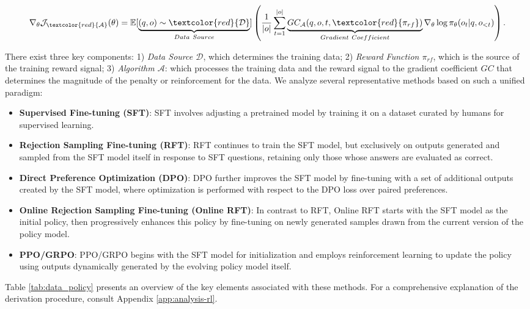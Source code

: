 \begin{itemize}[topsep=0pt]
\begin{itemize}[topsep=0pt]
\begin{equation}
    \nabla_{\theta}\mathcal{J}_{\textcolor{red}{\mathcal{A}}}(\theta) = \mathbb{E}[\underbrace{(q,o) \sim \textcolor{red}{\mathcal{D}}}_{Data \ Source}]\left( \frac{1}{|o|} \sum_{t=1}^{|o|}  \underbrace{GC_{{\mathcal{A}}}(q, o, t, \textcolor{red}{\pi_{{rf}}})}_{Gradient \ Coefficient}  \nabla_{\theta}\log \pi_{\theta}(o_t | q, o_{<t})\right).
\label{eq:objective}
\end{equation}

There exist three key components: 1) \textit{Data Source $\mathcal{D}$}, which determines the training data; 2) \textit{Reward Function $\pi_{{rf}}$}, which is the source of the training reward signal; 3) \textit{Algorithm $\mathcal{A}$}: which processes the training data and the reward signal to the gradient coefficient $GC$ that determines the magnitude of the penalty or reinforcement for the data. We analyze several representative methods based on such a unified paradigm:

\begin{itemize}
    \item  \textbf{Supervised Fine-tuning (SFT)}: SFT involves adjusting a pretrained model by training it on a dataset curated by humans for supervised learning.
    \item \textbf{Rejection Sampling Fine-tuning (RFT)}: RFT continues to train the SFT model, but exclusively on outputs generated and sampled from the SFT model itself in response to SFT questions, retaining only those whose answers are evaluated as correct.
    \item \textbf{Direct Preference Optimization (DPO)}: DPO further improves the SFT model by fine-tuning with a set of additional outputs created by the SFT model, where optimization is performed with respect to the DPO loss over paired preferences.
    \item \textbf{Online Rejection Sampling Fine-tuning (Online RFT)}: In contrast to RFT, Online RFT starts with the SFT model as the initial policy, then progressively enhances this policy by fine-tuning on newly generated samples drawn from the current version of the policy model.
    \item \textbf{PPO/GRPO}: PPO/GRPO begins with the SFT model for initialization and employs reinforcement learning to update the policy using outputs dynamically generated by the evolving policy model itself.
\end{itemize}

Table \ref{tab:data_policy} presents an overview of the key elements associated with these methods. For a comprehensive explanation of the derivation procedure, consult Appendix \ref{app:analysis-rl}.


\end{itemize}
\end{itemize}
